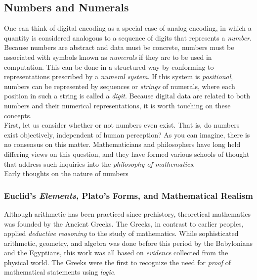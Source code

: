 
\subsection{Numbers and Numerals}



One can think of digital encoding as a special case of analog encoding, in which a quantity is considered analogous to a sequence of digits that represents a \textit{number}. Because numbers are abstract and data must be concrete, numbers must be associated with symbols known as \textit{numerals} if they are to be used in computation. This can be done in a structured way by conforming to representations prescribed by a \textit{numeral system}. If this system is \textit{positional}, numbers can be represented by sequences or \textit{strings} of numerals, where each position in such a string is called a \textit{digit}. Because digital data are related to both numbers and their numerical representations, it is worth touching on these concepts. \\

First, let us consider whether or not numbers even exist. That is, do numbers exist objectively, independent of human perception? As you can imagine, there is no consensus on this matter. Mathematicians and philosophers have long held differing views on this question, and they have formed various schools of thought that address such inquiries into the \textit{philosophy of mathematics}. \\

Early thoughts on the nature of numbers \\

\subsubsection{Euclid's \textit{Elements}, Plato's Forms, and Mathematical Realism}

Although arithmetic has been practiced since prehistory, theoretical mathematics was founded by the Ancient Greeks. The Greeks, in contrast to earlier peoples, applied \textit{deductive reasoning} to the study of mathematics. While sophisticated arithmetic, geometry, and algebra was done before this period by the Babylonians and the Egyptians, this work was all based on \textit{evidence} collected from the physical world. The Greeks were the first to recognize the need for \textit{proof} of mathematical statements using \textit{logic}. \\

